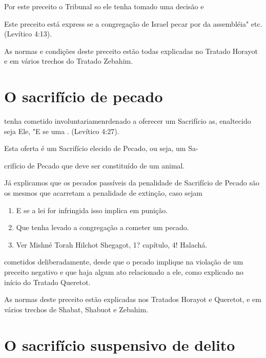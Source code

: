 \begin{itemize}
\begin{enumrate}
\begin{itemize}
\begin{itemize}
Por este preceito o Tribunal so ele tenha tomado uma decisão e

Este preceito está express se a congregação de Israel pecar por da
assembléia" etc. (Levítico 4:13).

As normas e condições deste preceito estão todas explicadas no Tra­tado
Horayot e em vários trechos do Tratado Zebahim.

\section{O sacrifício de pecado}


tenha cometido involuntariamen­rdenado a oferecer um Sacrifício as,
enaltecido seja Ele, "E se uma . (Levítico 4:27).


Esta oferta é um Sacrifício elecido de Pecado, ou seja, um Sa-

crifício de Pecado que deve ser constituído de um animal.

Já explicamos que os pecados passíveis da penalidade de Sacrifício de
Pecado são os mesmos que acarretam a penalidade de extinção, caso sejam


\begin{enumerate}
\def\labelenumi{\arabic{enumi}.}
\setcounter{enumi}{84}
\item
 
 E se a lei for infringida isso implica em punição.
 
\item
 
 Que tenha levado a congregação a cometer um pecado.
 
\item
 
 Ver Mishné Torah Hilchot Shegagot, 1? capítulo, 4! Halachá.
 
\end{enumerate}




cometidos deliberadamente, desde que o pecado implique na violação de um
preceito negativo e que haja algum ato relacionado a ele, como explicado
no início do Tratado Queretot.

As normas deste preceito estão explicadas nos Tratados Horayot e
Queretot, e em vários trechos de Shabat, Shabuot e Zebahim.

\section{O sacrifício suspensivo de delito}


\end{itemize}
\end{itemize}
\end{enumrate}
\end{itemize}
